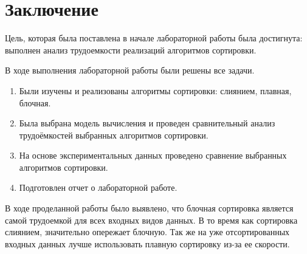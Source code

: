 \chapter*{Заключение}

Цель, которая была поставлена в начале лабораторной работы была достигнута: выполнен анализ трудоемкости реализаций алгоритмов сортировки.

В ходе выполнения лабораторной работы были решены все задачи.
\begin{enumerate}
	\item Были изучены и реализованы алгоритмы сортировки: слиянием, плавная, блочная.
	\item Была выбрана модель вычисления и проведен сравнительный анализ трудоёмкостей выбранных алгоритмов сортировки.
	\item На основе экспериментальных данных проведено сравнение выбранных алгоритмов сортировки.
	\item Подготовлен отчет о лабораторной работе.
\end{enumerate}

В ходе проделанной работы было выявлено, что блочная сортировка является самой трудоемкой для всех входных видов данных. В то время как сортировка слиянием, значительно опережает блочную. Так же на уже отсортированных входных данных лучше использовать плавную сортировку из-за ее скорости.

